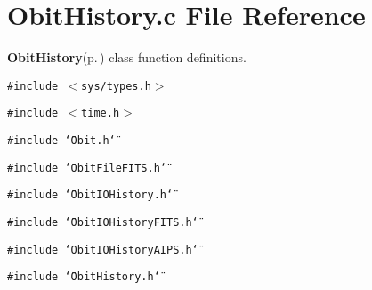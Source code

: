 \section{Obit\-History.c File Reference}
\label{ObitHistory_8c}
{\bf Obit\-History}{\rm (p.\,\pageref{structObitHistory})} class function definitions. 

{\tt \#include $<$sys/types.h$>$}\par
{\tt \#include $<$time.h$>$}\par
{\tt \#include \char`\"{}Obit.h\char`\"{}}\par
{\tt \#include \char`\"{}Obit\-File\-FITS.h\char`\"{}}\par
{\tt \#include \char`\"{}Obit\-IOHistory.h\char`\"{}}\par
{\tt \#include \char`\"{}Obit\-IOHistory\-FITS.h\char`\"{}}\par
{\tt \#include \char`\"{}Obit\-IOHistory\-AIPS.h\char`\"{}}\par
{\tt \#include \char`\"{}Obit\-History.h\char`\"{}}\par
